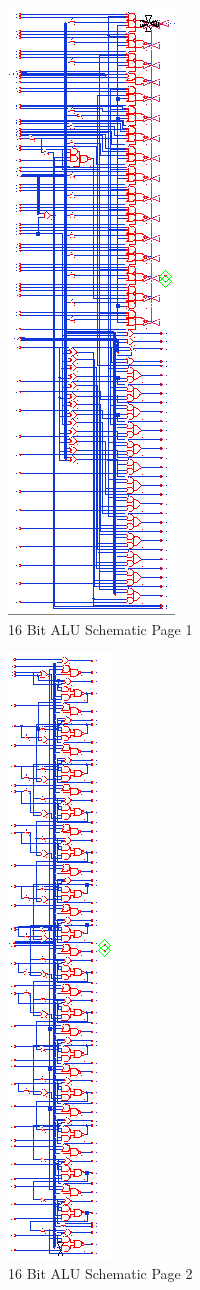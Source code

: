 \documentclass[11pt]{article}
\begin{document}
			
			\begin{figure}[H]
				\centering
				\includegraphics[width=0.3\linewidth]{"Pictures/ALU-16Bit Schematic 1"}
				\caption{16 Bit ALU Schematic Page 1}
				\label{fig:alu-16bit-schematic-1}
			\end{figure}
		
			\begin{figure}[H]
				\centering
				\includegraphics[width=0.2\linewidth]{"Pictures/ALU-16Bit Schematic 2"}
				\caption{16 Bit ALU Schematic Page 2}
				\label{fig:alu-16bit-schematic-2}
			\end{figure}
		
\end{document}
